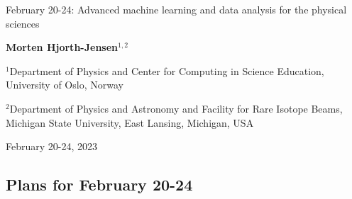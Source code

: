 \documentclass[%
oneside,                 %
final,                   %
10pt]{article}
\begin{document}

\newcommand{\exercisesection}[1]{\subsection*{#1}}






\thispagestyle{empty}

\begin{center}
{\LARGE\bf
\begin{spacing}{1.25}
February 20-24: Advanced machine learning and data analysis for the physical sciences
\end{spacing}
}
\end{center}


\begin{center}
{\bf Morten Hjorth-Jensen${}^{1, 2}$} \\ [0mm]
\end{center}

\begin{center}
\centerline{{\small ${}^1$Department of Physics and Center for Computing in Science Education, University of Oslo, Norway}}
\centerline{{\small ${}^2$Department of Physics and Astronomy and Facility for Rare Isotope Beams, Michigan State University, East Lansing, Michigan, USA}}
\end{center}
    

\begin{center}
February 20-24, 2023
\end{center}

\vspace{1cm}


\subsection*{Plans for February 20-24}


\paragraph{}
\end{document}
